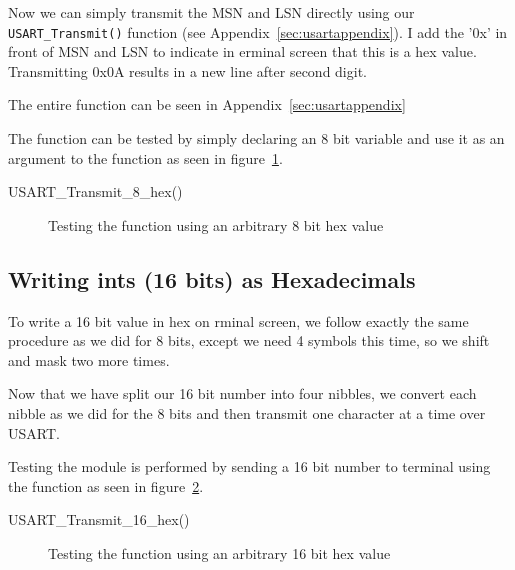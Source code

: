 \documentclass[11pt,a4paper,titlepage]{article}
\begin{document}
	\noindent Now we can simply transmit the MSN and LSN directly using our\\\verb|USART_Transmit()| function (see Appendix~\ref{sec:usartappendix}). I add the '0x' in front of MSN and LSN to indicate in erminal screen that this is a hex value. Transmitting 0x0A results in a new line after second digit.
	
	The entire function can be seen in Appendix~\ref{sec:usartappendix}

	The function can be tested by simply declaring an 8 bit variable and use it as an argument to the function as seen in figure~\ref{fig:8bitsend}.
	
	\begin{verbbox}
		USART_Transmit_8_hex()
	\end{verbbox}
	\begin{figure}[h]
		\centering
		\caption{Testing the function \theverbbox using an arbitrary 8 bit hex value}
		\label{fig:8bitsend}
	\end{figure}
	
	\subsection{Writing ints (16 bits) as Hexadecimals}
		To write a 16 bit value in hex on rminal screen, we follow exactly the same procedure as we did for 8 bits, except we need 4 symbols this time, so we shift and mask two more times.
		
		
		\noindent Now that we have split our 16 bit number into four nibbles, we convert each nibble as we did for the 8 bits and then transmit one character at a time over USART.
		
		
		
		\noindent Testing the module is performed by sending a 16 bit number to terminal using the function as seen in figure~\ref{fig:16bitsend}.
		
		\begin{verbbox}
			USART_Transmit_16_hex()
		\end{verbbox}
		\begin{figure}[h]
			\centering
			\caption{Testing the function \theverbbox using an arbitrary 16 bit hex value}
			\label{fig:16bitsend}
		\end{figure}
		
\end{document}
